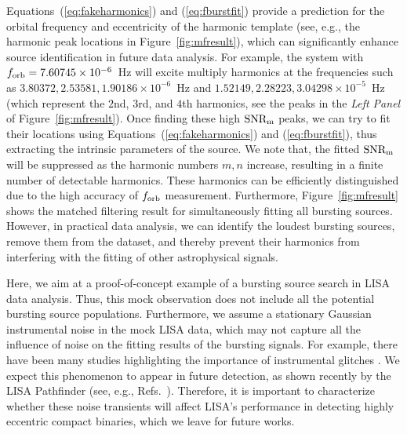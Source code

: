\documentclass[%
 reprint,
 amsmath,amssymb,
 aps,
]{revtex4-2}
\begin{document}
Equations~(\ref{eq:fakeharmonics}) and (\ref{eq:fburstfit}) provide a prediction for the orbital frequency and eccentricity of the harmonic template (see, e.g., the harmonic peak locations in Figure~\ref{fig:mfresult}), which can significantly enhance source identification in future data analysis. For example, the system with $f_{\rm orb}=7.60745\times 10^{-6}$~Hz will excite multiply harmonics at the frequencies such as $3.80372, 2.53581,1.90186\times 10^{-6}$~Hz and $1.52149, 2.28223,3.04298\times 10^{-5}$~Hz (which represent the $2$nd, $3$rd, and $4$th harmonics, see the peaks in the {\it Left Panel} of Figure~\ref{fig:mfresult}). Once finding these high $\rm SNR_m$ peaks, we can try to fit their locations using Equations~(\ref{eq:fakeharmonics}) and (\ref{eq:fburstfit}), thus extracting the intrinsic parameters of the source. We note that, the fitted $\rm SNR_m$ will be suppressed as the harmonic numbers $m,n$ increase, resulting in a finite number of detectable harmonics. These harmonics can be efficiently distinguished due to the high accuracy of $f_{\rm orb}$ measurement. Furthermore, Figure~\ref{fig:mfresult} shows the matched filtering result for simultaneously fitting all bursting sources. However, in practical data analysis, we can identify the loudest bursting sources, remove them from the dataset, and thereby prevent their harmonics from interfering with the fitting of other astrophysical signals.

Here, we aim at a proof-of-concept example of a bursting source search in LISA data analysis. Thus, this mock observation does not include all the potential bursting source populations. Furthermore, we assume a stationary Gaussian instrumental noise in the mock LISA data, which may not capture all the influence of noise on the fitting results of the bursting signals. For example, there have been many studies highlighting the importance of instrumental glitches \citep[see, e.g., ][]{Robson_2019glitches,LISApathfinder22glitch,LISApathfinder22transientacc}. We expect this phenomenon to appear in future detection, as shown recently by the LISA Pathfinder (see, e.g., Refs.~\citep{LISApathfinder16,LISApathfinder16b}). Therefore, it is important to characterize whether these noise transients will affect LISA's performance in detecting highly eccentric compact binaries, which we leave for future works. 
\end{document}
